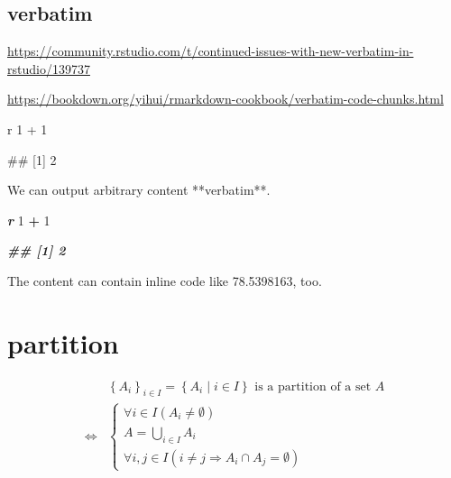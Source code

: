 \documentclass[
]{book}
\newenvironment{Shaded}{\begin{snugshade}}{\end{snugshade}}
\newcommand{\DecValTok}[1]{\textcolor[rgb]{0.00,0.00,0.81}{#1}}
\newcommand{\InformationTok}[1]{\textcolor[rgb]{0.56,0.35,0.01}{\textbf{\textit{#1}}}}
\newcommand{\NormalTok}[1]{#1}
\newcommand{\SpecialCharTok}[1]{\textcolor[rgb]{0.81,0.36,0.00}{\textbf{#1}}}
\theoremstyle{definition}
\theoremstyle{definition}
\theoremstyle{definition}
\theoremstyle{definition}
\theoremstyle{remark}
\begin{document}
\hypertarget{verbatim}{%
\section{verbatim}\label{verbatim}}

\url{https://community.rstudio.com/t/continued-issues-with-new-verbatim-in-rstudio/139737}

\url{https://bookdown.org/yihui/rmarkdown-cookbook/verbatim-code-chunks.html}

\begin{Shaded}
\begin{Highlighting}[]


\NormalTok{\textasciigrave{}\textasciigrave{}\textasciigrave{}r}
\NormalTok{1 + 1}
\NormalTok{\textasciigrave{}\textasciigrave{}\textasciigrave{}}

\NormalTok{\textasciigrave{}\textasciigrave{}\textasciigrave{}}
\NormalTok{\#\# [1] 2}
\NormalTok{\textasciigrave{}\textasciigrave{}\textasciigrave{}}
\end{Highlighting}
\end{Shaded}

\begin{Shaded}
\begin{Highlighting}[]
\NormalTok{We can output arbitrary content **verbatim**.}


\InformationTok{\textasciigrave{}\textasciigrave{}\textasciigrave{}r}
\DecValTok{1} \SpecialCharTok{+} \DecValTok{1}
\InformationTok{\textasciigrave{}\textasciigrave{}\textasciigrave{}}

\InformationTok{\textasciigrave{}\textasciigrave{}\textasciigrave{}}
\InformationTok{\#\# [1] 2}
\InformationTok{\textasciigrave{}\textasciigrave{}\textasciigrave{}}

\NormalTok{The content can contain inline code like}
\NormalTok{78.5398163, too.}
\end{Highlighting}
\end{Shaded}

\hypertarget{partition}{%
\chapter{partition}\label{partition}}

\begin{align*}
 & \left\{ A_{i}\right\} _{i\in I}=\left\{ A_{i}\middle|i\in I\right\} \text{ is a partition of a set }A\\
\Leftrightarrow & \begin{cases}
\forall i\in I\left(A_{i}\ne\emptyset\right)\\
A=\bigcup\limits _{i\in I}A_{i}\\
\forall i,j\in I\left(i\ne j\Rightarrow A_{i}\cap A_{j}=\emptyset\right)
\end{cases}
\end{align*}
\end{document}
